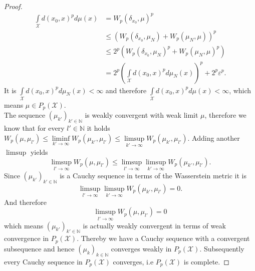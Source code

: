 \documentclass[11pt,a4paper]{article}
\begin{document}
\begin{proof}
\begin{align*}
\int\limits_{\mathcal{X}}d(x_0,x)^pd\mu(x) &= W_p(\delta_{x_0},\mu)^p\\&\leq\left(W_p(\delta_{x_0},\mu_N) + W_p(\mu_N,\mu)\right)^p\\&\leq{}2^p\left(W_p(\delta_{x_0},\mu_N)^p + W_p(\mu_N,\mu)^p\right) \\&= 2^p\left(\int\limits_{\mathcal{X}}d(x_0,x)^pd\mu_N(x)\right)^p + 2^p\varepsilon^p.
\end{align*}
It is $\int\limits_{\mathcal{X}}d(x_0,x)^pd\mu_N(x)<\infty$ and therefore $\int\limits_{\mathcal{X}}d(x_0,x)^pd\mu(x)<\infty$, which means $\mu\in{}P_p(\mathcal{X}).$\vspace{1em}\\
The sequence $(\mu_{k'})_{k'\in\mathbb{N}}$ is weakly convergent with weak limit $\mu$, therefore we know that for every $l'\in\mathbb{N}$ it holds $W_p(\mu,\mu_{l'})\leq\liminf\limits_{k'\rightarrow\infty}W_p(\mu_{k'},\mu_{l'})\leq\limsup\limits_{k'\rightarrow\infty}W_p(\mu_{k'},\mu_{l'})$. Adding another $\limsup$ yields
\[
\limsup\limits_{l'\rightarrow\infty}W_p(\mu,\mu_{l'})\leq\limsup\limits_{l'\rightarrow\infty}\limsup\limits_{k'\rightarrow\infty}W_p(\mu_{k'},\mu_{l'}).
\]
Since $(\mu_{k'})_{k'\in\mathbb{N}}$ is a Cauchy sequence in terms of the Wasserstein metric it is 
\[
\limsup\limits_{l'\rightarrow\infty}\limsup\limits_{k'\rightarrow\infty}W_p(\mu_{k'},\mu_{l'})=0.
\]
And therefore 
\[
\limsup\limits_{l'\rightarrow\infty}W_p(\mu,\mu_{l'})=0
\]
which means $(\mu_{k'})_{k'\in\mathbb{N}}$ is actually weakly convergent in terms of weak convergence in $P_p(\mathcal{X}).$
Thereby we have a Cauchy sequence with a convergent subsequence and hence $(\mu_k)_{k\in\mathbb{N}}$ converges weakly in $P_p(\mathcal{X}).$ Subsequently every Cauchy sequence in $P_p(\mathcal{X})$ converges, i.e $P_p(\mathcal{X})$ is complete.
\end{proof}
\end{document}
